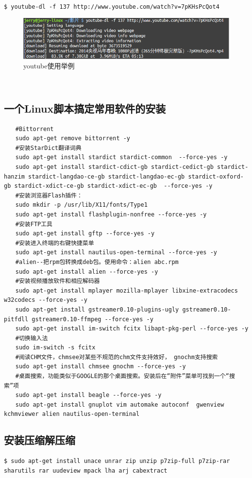 \verb"$ youtube-dl -f 137 http://www.youtube.com/watch?v=7pKHsPcQot4"
\begin{figure}
\centering\includegraphics[scale=0.5]{figures/youtube1.png}
\caption{youtube使用举例}\label{youtube2}
\end{figure} 

\subsection{一个Linux脚本搞定常用软件的安装}
\begin{verbatim}
　　#Bittorrent
　　sudo apt-get remove bittorrent -y
　　#安装StarDict翻译词典
　　sudo apt-get install stardict stardict-common  --force-yes -y
　　sudo apt-get install stardict-cdict-gb stardict-cedict-gb stardict-hanzim stardict-langdao-ce-gb stardict-langdao-ec-gb stardict-oxford-gb stardict-xdict-ce-gb stardict-xdict-ec-gb  --force-yes -y
　　#安装浏览器Flash插件：
　　sudo mkdir -p /usr/lib/X11/fonts/Type1
　　sudo apt-get install flashplugin-nonfree --force-yes -y
　　#安装FTP工具
　　sudo apt-get install gftp --force-yes -y
　　#安装进入终端的右键快捷菜单
　　sudo apt-get install nautilus-open-terminal --force-yes -y
　　#alien--把rpm包转换成deb包。使用命令：alien abc.rpm
　　sudo apt-get install alien --force-yes -y
　　#安装视频播放软件和相应解码器
　　sudo apt-get install mplayer mozilla-mplayer libxine-extracodecs w32codecs --force-yes -y
　　sudo apt-get install gstreamer0.10-plugins-ugly gstreamer0.10-pitfdll gstreamer0.10-ffmpeg --force-yes -y
　　sudo apt-get install im-switch fcitx libapt-pkg-perl --force-yes -y
　　#切换输入法
　　sudo im-switch -s fcitx
　　#阅读CHM文件，chmsee对某些不规范的chm文件支持效好， gnochm支持搜索
　　sudo apt-get install chmsee gnochm --force-yes -y
　　#桌面搜索，功能类似于GOOGLE的那个桌面搜索。安装后在“附件”菜单可找到一个“搜索”项
　　sudo apt-get install beagle --force-yes -y
　　sudo apt-get install gnuplot vim automake autoconf  gwenview kchmviewer alien nautilus-open-terminal
\end{verbatim}

\subsection{安装压缩解压缩}
\verb"$ sudo apt-get install unace unrar zip unzip p7zip-full p7zip-rar sharutils rar uudeview mpack lha arj cabextract"

